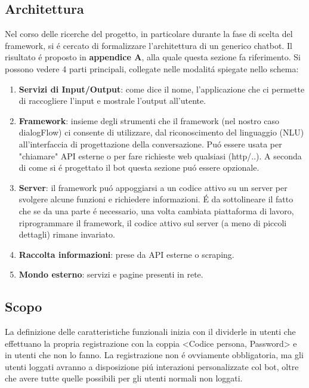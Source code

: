 \documentclass[]{article}
\begin{document}
\subsection{Architettura}
Nel corso delle ricerche del progetto, in particolare durante la fase di scelta del framework, si é cercato di formalizzare l'architettura di un generico chatbot. Il risultato é proposto in \textbf{appendice A}, alla quale questa sezione fa riferimento. Si possono vedere 4 parti principali, collegate nelle modalitá spiegate nello schema: 
\begin{enumerate}
\item \textbf{Servizi di Input/Output}: come dice il nome, l'applicazione che ci permette di raccogliere l'input e mostrale l'output all'utente.
\item \textbf{Framework}: insieme degli strumenti che il framework (nel nostro caso dialogFlow) ci consente di utilizzare, dal riconoscimento del linguaggio (NLU) all'interfaccia di progettazione della conversazione. Puó essere usata per "chiamare" API esterne o per fare richieste web qualsiasi (http/..). A seconda di come si é progettato il bot questa sezione puó essere opzionale.
\item \textbf{Server}: il framework puó appoggiarsi a un codice attivo su un server per svolgere alcune funzioni e richiedere informazioni. É da sottolineare il fatto che se da una parte é necessario, una volta cambiata piattaforma di lavoro, riprogrammare il framework, il codice attivo sul server (a meno di piccoli dettagli) rimane invariato.
\item \textbf{Raccolta informazioni}: prese da API esterne o scraping.
\item \textbf{Mondo esterno}: servizi e pagine presenti in rete.
\end{enumerate}

\subsection{Scopo}
La definizione delle caratteristiche funzionali inizia con il dividerle in utenti che effettuano la propria registrazione con la coppia <Codice persona, Password> e in utenti che non lo fanno. La registrazione non é ovviamente obbligatoria, ma gli utenti loggati avranno a disposizione piú interazioni personalizzate col bot, oltre che avere tutte quelle possibili per gli utenti normali non loggati.
\end{document}
